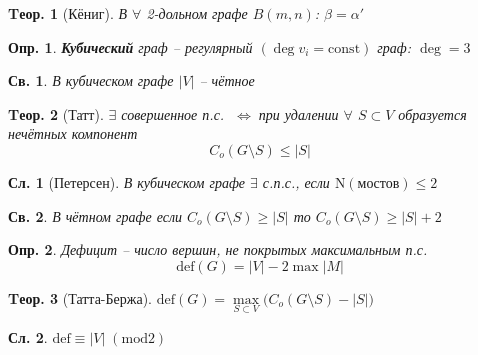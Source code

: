 \documentclass[a4paper,12pt]{article}
\newtheorem{definition}{Опр.}[section]
\newtheorem{property}{Св.}[definition]
\newtheorem{theorem}{Tеор.}[section]
\newtheorem{corollary}{Сл.}[theorem]
\def\iiff{$\;\Longleftrightarrow\;$}
\begin{document}
\begin{theorem}[Кёниг]
	В $\forall$ 2-дольном графе $B(m,n)$: $\beta = \alpha'$
\end{theorem}

\begin{definition}
	\textbf{Кубический} граф -- регулярный $(\deg v_i = \mathrm{const})$ граф: $\deg = 3$
\end{definition}

\begin{property}
	В кубическом графе $|V|$ -- чётное
\end{property}

\begin{theorem}[Татт]
	$\exists$ совершенное п.с. \iiff при удалении $\forall$ $S \subset V$ образуется нечётных компонент
	\[ C_{o}(G \setminus S) \leqslant |S| \]
\end{theorem}

\begin{corollary}[Петерсен]
	В кубическом графе $\exists$ с.п.с., если $\mathrm{N}(мостов) \leqslant 2$
\end{corollary}

\begin{property}
В чётном графе если $C_{o}(G \setminus S) \ge |S|$ то $C_{o}(G \setminus S) \geqslant |S|+2$
\end{property}

\begin{definition}
	Дефицит -- число вершин, не покрытых максимальным п.с.
	\[ \mathrm{def}(G)=|V|-2\max|M| \]
\end{definition}

\begin{theorem}[Татта-Бержа]
	$ \mathrm{def}(G) = \max\limits_{S \subset V} \big( C_{o}(G \setminus S) - \left|S\right| \big) $
\end{theorem}

\begin{corollary}
	$ \mathrm{def} \equiv |V| \; (\mathrm{mod} 2) $
\end{corollary}
\end{document}

